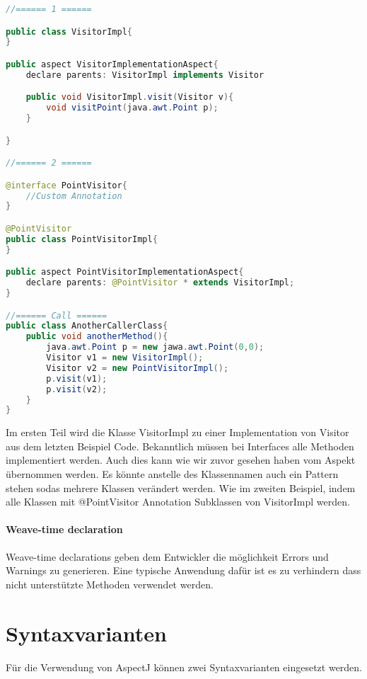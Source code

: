 \begin{lstlisting}[language=Java]
//====== 1 ======

public class VisitorImpl{
}

public aspect VisitorImplementationAspect{
	declare parents: VisitorImpl implements Visitor

	public void VisitorImpl.visit(Visitor v){
		void visitPoint(java.awt.Point p);
	}

}

//====== 2 ======

@interface PointVisitor{
	//Custom Annotation
}

@PointVisitor
public class PointVisitorImpl{
}

public aspect PointVisitorImplementationAspect{
	declare parents: @PointVisitor * extends VisitorImpl;
}

//====== Call ======
public class AnotherCallerClass{
	public void anotherMethod(){
		java.awt.Point p = new jawa.awt.Point(0,0);
		Visitor v1 = new VisitorImpl();
		Visitor v2 = new PointVisitorImpl();
		p.visit(v1);
		p.visit(v2);
	}
}
\end{lstlisting}

Im ersten Teil wird die Klasse VisitorImpl zu einer Implementation von Visitor aus dem letzten Beispiel Code. Bekanntlich müssen bei Interfaces alle Methoden implementiert werden. Auch dies kann wie wir zuvor gesehen haben vom Aspekt übernommen werden.
Es könnte anstelle des Klassennamen auch ein Pattern stehen sodas mehrere Klassen verändert werden.
Wie im zweiten Beispiel, indem alle Klassen mit @PointVisitor Annotation Subklassen von VisitorImpl werden.

\paragraph{Weave-time declaration}
Weave-time declarations geben dem Entwickler die möglichkeit Errors und Warnings zu generieren. Eine typische Anwendung dafür ist es zu verhindern dass nicht unterstützte Methoden verwendet werden.



\section{Syntaxvarianten}
Für die Verwendung von AspectJ können zwei Syntaxvarianten eingesetzt werden.

